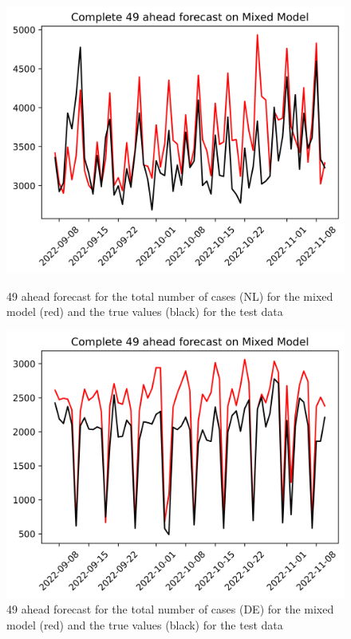 \begin{figure}

\begin{minipage}{.45\textwidth}
  \centering
  \includegraphics[width=\linewidth]{pics/49_ah/Complete_49_ahead_Mixed Model.png}
  \caption{49 ahead forecast for the total number of cases (NL) for the mixed model (red) and the true values (black) for the test data}
  \label{fig:tot_cases_fc_49_mix}
\end{minipage}
\begin{minipage}{.45\textwidth}
  \centering
  \includegraphics[width=\linewidth]{pics/49_ah/DE_Complete_49_ahead_Mixed Model.png}
  \caption{49 ahead forecast for the total number of cases (DE) for the mixed model (red) and the true values (black) for the test data}
  \label{fig:tot_cases_fc_49_mix_DE}
\end{minipage}

\end{figure}
